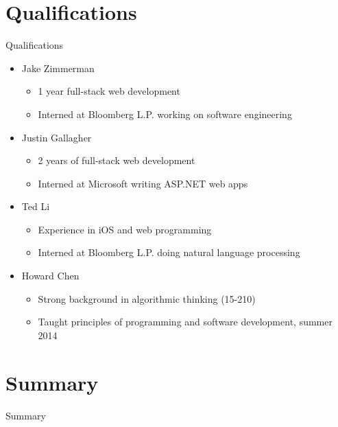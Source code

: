 \documentclass[xcolor=dvipsnames]{beamer}
\begin{document}
\section{Qualifications}\label{quals}
\begin{frame}{Qualifications}

\begin{itemize}
\itemsep1pt\parskip0pt
\item
  Jake Zimmerman

  \begin{itemize}
  \itemsep1pt\parskip0pt
  \item
    1 year full-stack web development
  \item
    Interned at Bloomberg L.P. working on software engineering
  \end{itemize}
\item
  Justin Gallagher

  \begin{itemize}
  \itemsep1pt\parskip0pt
  \item
    2 years of full-stack web development
  \item
    Interned at Microsoft writing ASP.NET web apps
  \end{itemize}
\item
  Ted Li

  \begin{itemize}
  \itemsep1pt\parskip0pt
  \item
    Experience in iOS and web programming
  \item
    Interned at Bloomberg L.P. doing natural language processing
  \end{itemize}
\item
  Howard Chen

  \begin{itemize}
  \itemsep1pt\parskip0pt
  \item
    Strong background in algorithmic thinking (15-210)
  \item
    Taught principles of programming and software development, summer
    2014
  \end{itemize}
\end{itemize}

\end{frame}

\section{Summary}\label{summary}
\begin{frame}{Summary}
  \tableofcontents
\end{frame}
\end{document}
